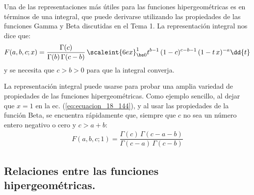 Una de las representaciones más útiles para las funciones hipergeométricas es en términos de una integral, que puede derivarse utilizando las propiedades de las funciones Gamma y Beta discutidas en el Tema 1. La representación integral nos dice que:
\begin{align}
F(a, b, c; x) = \dfrac{\Gamma (c)}{\Gamma (b) \, \Gamma (c -b)} \, \scaleint{6ex}_{\bs 0}^{1} t^{b-1} \, (1 - c)^{c-b-1} \, (1 - t \, x)^{-a} \dd{t}
\label{eq:ecuacion_18_144}
\end{align}
y se necesita que $c > b > 0$ para que la integral converja.
\par
La representación integral puede usarse para probar una amplia variedad de propiedades de las funciones hipergeométricas. Como ejemplo sencillo, al dejar que $x = 1$ en la ec. (\ref{eq:ecuacion_18_144}), y al usar las propiedades de la función Beta, se encuentra rápidamente que, siempre que $c$ no sea un número entero negativo o cero y $c > a + b$:
\begin{align*}
F(a, b, c; 1) = \dfrac{\Gamma (c) \, \Gamma (c - a - b)}{\Gamma (c - a) \, \Gamma(c - b)}
\end{align*}

\subsection{Relaciones entre las funciones hipergeométricas.}

